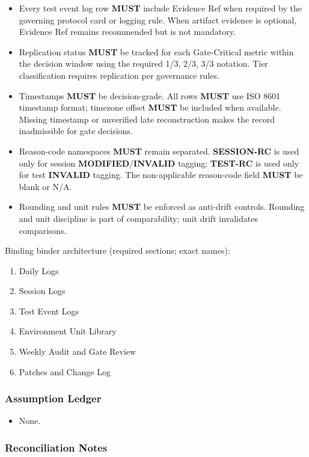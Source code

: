 \documentclass[10pt]{article}
\begin{document}
\begin{itemize}
\item Every test event log row \textbf{MUST} include Evidence Ref when required by the governing protocol card or logging rule. When artifact evidence is optional, Evidence Ref remains recommended but is not mandatory.
\item Replication status \textbf{MUST} be tracked for each Gate-Critical metric within the decision window using the required 1/3, 2/3, 3/3 notation. Tier classification requires replication per governance rules.
\item Timestamps \textbf{MUST} be decision-grade. All rows \textbf{MUST} use ISO 8601 timestamp format; timezone offset \textbf{MUST} be included when available. Missing timestamp or unverified late reconstruction makes the record inadmissible for gate decisions.
\item Reason-code namespaces \textbf{MUST} remain separated. \textbf{SESSION-RC} is used only for session \textbf{MODIFIED}/\textbf{INVALID} tagging; \textbf{TEST-RC} is used only for test \textbf{INVALID} tagging. The non-applicable reason-code field \textbf{MUST} be blank or N/A.
\item Rounding and unit rules \textbf{MUST} be enforced as anti-drift controls. Rounding and unit discipline is part of comparability; unit drift invalidates comparisons.
\end{itemize}

Binding binder architecture (required sections; exact names):

\begin{enumerate}
\item Daily Logs
\item Session Logs
\item Test Event Logs
\item Environment Unit Library
\item Weekly Audit and Gate Review
\item Patches and Change Log
\end{enumerate}

\subsubsection*{Assumption Ledger}

\begin{itemize}
\item None.
\end{itemize}

\subsubsection*{Reconciliation Notes}
\end{document}
